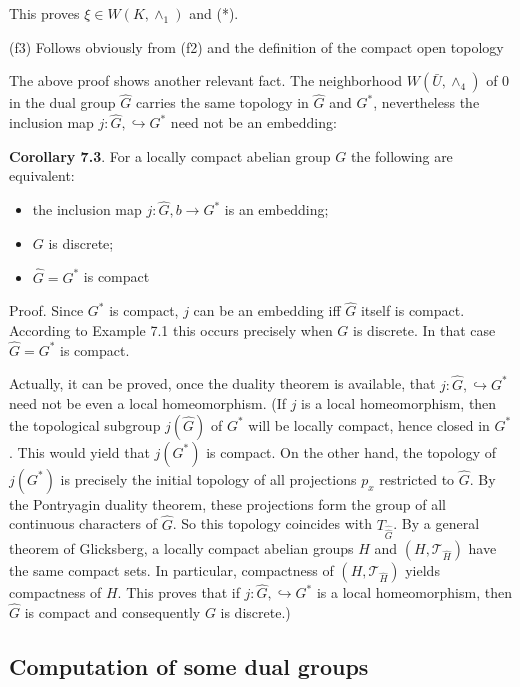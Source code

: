 \documentclass[12pt]{article}
\begin{document}
\begin{itemize}
\begin{itemize}
This proves $\xi \in W(K,\wedge_1)$ and (*).


    (f3) Follows obviously from (f2) and the definition of the compact open topology


    The above proof shows another relevant fact. The neighborhood $W(\bar{U},\wedge_4)$ of 0 in the dual group $\hat{G}$ carries
the same topology in $\hat{G}$ and $G^*$, nevertheless the inclusion map $j : \hat{G} , \hookrightarrow G^*$ need not be an embedding:
    

\textbf{Corollary 7.3}. For a locally compact abelian group $G$ the following are equivalent:


    \begin{itemize}

        \item the inclusion map $j : \hat{G} , b \to G^*$ is an embedding;

        \item $G$ is discrete;

        \item $\hat{G} = G^*$ is compact

    \end{itemize}


Proof. Since $G^*$ is compact, $j$ can be an embedding iff $\hat{G}$ itself is compact. According to Example 7.1 this
occurs precisely when $G$ is discrete. In that case $\hat{G} = G^*$ is compact.


    Actually, it can be proved, once the duality theorem is available, that $j : \hat{G}, \hookrightarrow G^*$ need not be even a local
homeomorphism. (If $j$ is a local homeomorphism, then the topological subgroup $j(\hat{G})$ of $G^*$ will be locally
compact, hence closed in $G^*$. This would yield that $j(G^*)$ is compact. On the other hand, the topology of
$j(G^*)$ is precisely the initial topology of all projections $p_x$ restricted to $\hat{G}$. By the Pontryagin duality theorem,
these projections form the group of all continuous characters of $\hat{G}$. So this topology coincides with $T_{\hat{\hat{G}}}$. By a
general theorem of Glicksberg, a locally compact abelian groups $H$ and $(H, \mathcal{T}_{\hat{H}})$ have the same compact sets.
In particular, compactness of $(H, \mathcal{T}_{\hat{H}})$ yields compactness of $H$. This proves that if $j : \hat{G}, \hookrightarrow G^*$ is a local
homeomorphism, then $\hat{G}$ is compact and consequently $G$ is discrete.)


\subsection{Computation of some dual groups}



\end{itemize}
\end{itemize}
\end{document}
